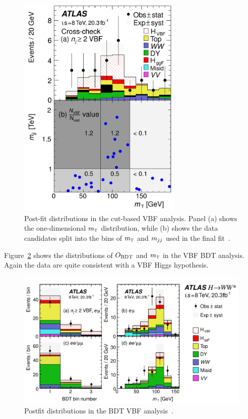 \begin{figure}[h!]
  \centering
  \captionsetup{justification=centering}
  \includegraphics[width=0.7\textwidth]{figures/VBF_cb_mt}
  \caption{Post-fit distributions in the cut-based VBF analysis. Panel (a) shows the one-dimensional $m_{\textrm{\footnotesize\sc t}}$ distribution, while (b) shows the data candidates split into the bins of $m_{\textrm{\footnotesize\sc t}}$ and $m_{jj}$ used in the final fit~\cite{WW2015}.}
  \label{fig:vbf_cb_mt}
\end{figure}

Figure~\ref{fig:vbf_bdt_mt} shows the distributions of $O_{\rm BDT}$ and $m_{\textrm{\footnotesize\sc t}}$ in the VBF BDT analysis. Again the data are quite consistent with a VBF Higgs hypothesis. 

\begin{figure}[h!]
  \centering
  \captionsetup{justification=centering}
  \includegraphics[width=\textwidth]{figures/VBF_bdt_mt}
  \caption{Postfit distributions in the BDT VBF analysis~\cite{WW2015}.}
  \label{fig:vbf_bdt_mt}
\end{figure}

